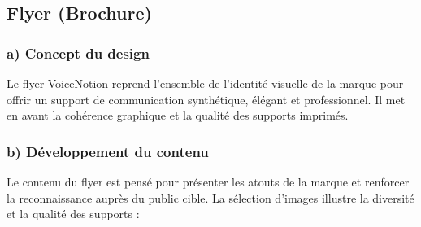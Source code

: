 \subsection{Flyer (Brochure)}
\subsubsection*{a) Concept du design}
Le flyer VoiceNotion reprend l’ensemble de l’identité visuelle de la marque pour offrir un support de communication synthétique, élégant et professionnel. Il met en avant la cohérence graphique et la qualité des supports imprimés.

\subsubsection*{b) Développement du contenu}
Le contenu du flyer est pensé pour présenter les atouts de la marque et renforcer la reconnaissance auprès du public cible. La sélection d’images illustre la diversité et la qualité des supports :

